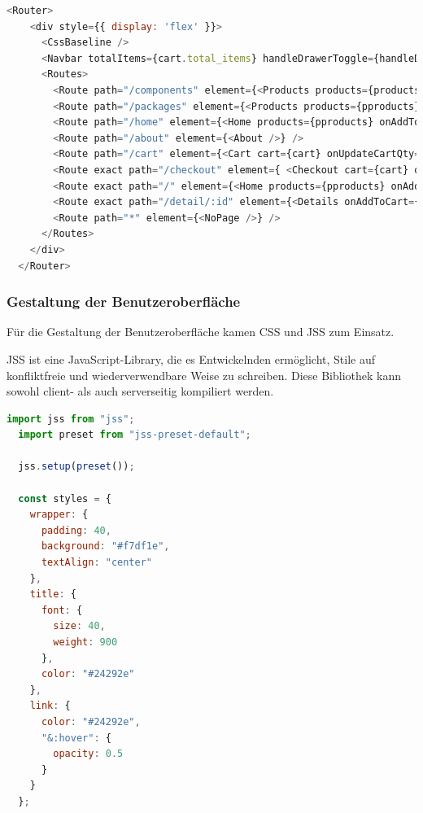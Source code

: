 \begin{lstlisting}[language=JavaScript, caption=Source-Code des Routers, label=lst:impl:reactRouterSourceCode]
  <Router>
    <div style={{ display: 'flex' }}>
      <CssBaseline />
      <Navbar totalItems={cart.total_items} handleDrawerToggle={handleDrawerToggle} />
      <Routes>
        <Route path="/components" element={<Products products={products} onAddToCart={handleAddToCart} handleUpdateCartQty />} />
        <Route path="/packages" element={<Products products={pproducts} onAddToCart={handleAddToCart} handleUpdateCartQty />} />
        <Route path="/home" element={<Home products={pproducts} onAddToCart={handleAddToCart} handleUpdateCartQty/>} />
        <Route path="/about" element={<About />} />
        <Route path="/cart" element={<Cart cart={cart} onUpdateCartQty={handleUpdateCartQty} onRemoveFromCart={handleRemoveFromCart} onEmptyCart={handleEmptyCart} /> } />
        <Route exact path="/checkout" element={ <Checkout cart={cart} order={order} onCaptureCheckout={handleCaptureCheckout} error={errorMessage} /> } />
        <Route exact path="/" element={<Home products={pproducts} onAddToCart={handleAddToCart} handleUpdateCartQty/>} />
        <Route exact path="/detail/:id" element={<Details onAddToCart={handleAddToCart} handleUpdateCartQty />} />
        <Route path="*" element={<NoPage />} />
      </Routes>
    </div>
  </Router> 
\end{lstlisting}

\subsubsection{Gestaltung der Benutzeroberfläche}

Für die Gestaltung der Benutzeroberfläche kamen CSS und JSS zum Einsatz.

JSS ist eine JavaScript-Library, die es Entwickelnden ermöglicht, Stile auf konfliktfreie und wiederverwendbare Weise zu schreiben. Diese Bibliothek kann sowohl client- als auch serverseitig kompiliert werden.
\cite{jss}

\begin{lstlisting}[language=JavaScript, caption=Beispiel Source-Code für die Verwendung von JSS, label=lst:impl:bspJSS]
  import jss from "jss";
  import preset from "jss-preset-default";
  
  jss.setup(preset());
  
  const styles = {
    wrapper: {
      padding: 40,
      background: "#f7df1e",
      textAlign: "center"
    },
    title: {
      font: {
        size: 40,
        weight: 900
      },
      color: "#24292e"
    },
    link: {
      color: "#24292e",
      "&:hover": {
        opacity: 0.5
      }
    }
  };
\end{lstlisting} \cite{jssExample}

